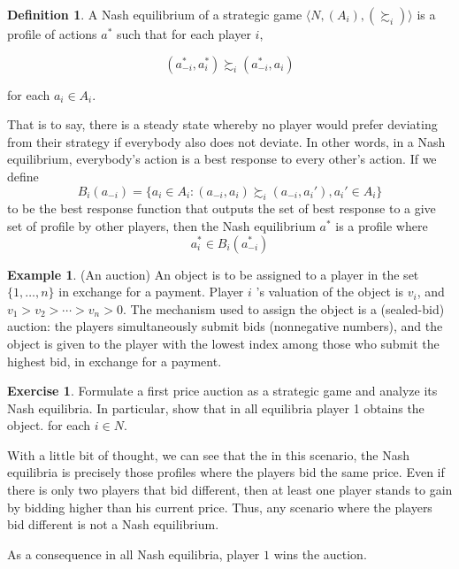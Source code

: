 \documentclass{tufte-handout}
\theoremstyle{definition}
\newtheorem{defn}[thm]{Definition}
\newtheorem{exmp}[thm]{Example}
\newtheorem{exer}[thm]{Exercise}
\theoremstyle{remark}
\begin{document}
\begin{defn}
    

A Nash equilibrium of a strategic game $\langle N, (A_i), (\succsim_i)\rangle$ is a profile of actions $a^*$ such that for each player $i$,

$$(a_{-i}^*, a_i^*) \succsim_i (a_{-i}^*, a_i)$$

for each $a_i\in A_i$. 

\end{defn}
That is to say, there is a steady state whereby no player would prefer deviating from their strategy if everybody also does not deviate.
In other words, in a Nash equilibrium, everybody's action is a best response to every other's action.
If we define $$B_i(a_{-i})=\{a_i \in A_i : (a_{-i}, a_i)\succsim_i (a_{-i}, a_i'), a_i'\in A_i\}$$
to be the best response function that outputs the set of best response to a give set of profile by other players, then the Nash equilibrium $a^*$ is a profile where
$$a_i^*\in B_i(a_{-i}^*)$$


\begin{exmp}
    (An auction) An object is to be assigned to a player in the set $\{1, \ldots, n\}$ in exchange for a payment. Player $i$ 's valuation of the object is $v_i$, and $v_1>v_2>\cdots>v_n>0$. The mechanism used to assign the object is a (sealed-bid) auction: the players simultaneously submit bids (nonnegative numbers), and the object is given to the player with the lowest index among those who submit the highest bid, in exchange for a payment.
\end{exmp}
\begin{exer}
    Formulate a first price auction as a strategic game and analyze its Nash equilibria. In particular, show that in all equilibria player 1 obtains the object.
for each $i\in N$.
\end{exer}
With a little bit of thought, we can see that the in this scenario, the Nash equilibria is precisely those profiles where the players bid the same price. Even if there is only two players that bid different, then at least one player stands to gain by bidding higher than his current price. Thus, any scenario where the players bid different is not a Nash equilibrium.

As a consequence in all Nash equilibria, player $1$ wins the auction.
\end{document}
